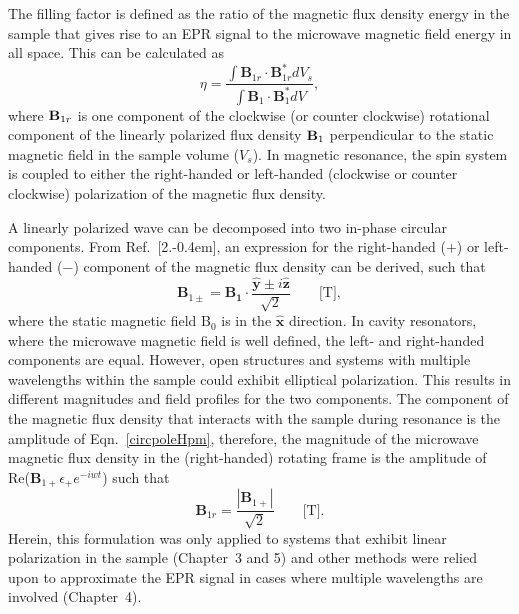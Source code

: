 The filling factor is defined as the ratio of the magnetic flux density energy in the sample that gives rise to an EPR signal to the microwave magnetic field energy in all space. This can be calculated as
\begin{equation}
 \eta = \frac{\int {\mathbf B}_{1r} \cdot {\mathbf B}_{1r}^* dV_s}{\int {\mathbf B}_1 \cdot {\mathbf B}_1^* dV}, \label{eq-2:filling}
\end{equation}
where ${\textbf B}_{1r}$ is one component of the clockwise (or counter clockwise) rotational component of the linearly polarized flux density ${\textbf B}_1$ perpendicular to the static magnetic field in the sample volume ($V_s$). \cite{jackson1975classical} In magnetic resonance, the spin system is coupled to either the right-handed or left-handed (clockwise or counter clockwise) polarization of the magnetic flux density. \cite{abragam1961}

A linearly polarized wave can be decomposed into two in-phase circular components. From Ref.~[2.\kern-0.4em], an expression for the right-handed ($+$) or left-handed ($-$) component of the magnetic flux density can be derived, such that
\begin{equation}
    \mathbf{B}_{1\pm} =  \mathbf{B_1}\cdot\frac{\mathbf{\hat{y}} \pm i\mathbf{\hat{z}}}{\sqrt{2}} \qquad \text{[T]}, \label{circpoleHpm}
\end{equation}
where the static magnetic field B$_0$ is in the $\mathbf{\hat{x}}$ direction. In cavity resonators, where the microwave magnetic field is well defined, the left- and right-handed components are equal. However, open structures and systems with multiple wavelengths within the sample could exhibit elliptical polarization. This results in different magnitudes and field profiles for the two components. The component of the magnetic flux density that interacts with the sample during resonance is the amplitude of Eqn.~\ref{circpoleHpm}, therefore, the magnitude of the microwave magnetic flux density in the (right-handed) rotating frame is the amplitude of Re($\mathbf{B}_{1+}\epsilon_+e^{-iwt}$) such that
\begin{equation}
    \mathbf{B}_{1r} =  \frac{|\mathbf{B}_{1+}|}{\sqrt{2}} \qquad \text{[T]}. \label{circpoleH}
\end{equation}
Herein, this formulation was only applied to systems that exhibit linear polarization in the sample (Chapter~3 and 5) and other methods were relied upon to approximate the EPR signal in cases where multiple wavelengths are involved (Chapter~4).

